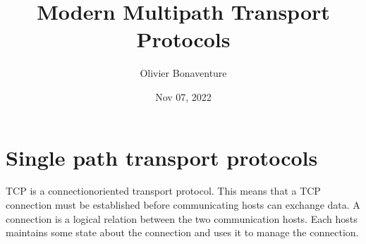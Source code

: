 \documentclass[letterpaper,10pt,english]{sphinxmanual}
\title{Modern Multipath Transport Protocols}
\date{Nov 07, 2022}
\author{Olivier Bonaventure}
\begin{document}
\pagestyle{empty}
\sphinxmaketitle
\pagestyle{plain}
\sphinxtableofcontents
\pagestyle{normal}
\label{\detokenize{index::doc}}



\chapter{Single path transport protocols}
\label{\detokenize{tcp:single-path-transport-protocols}}\label{\detokenize{tcp:chapter-tcp}}\label{\detokenize{tcp::doc}}
\sphinxAtStartPar
TCP is a connection\sphinxhyphen{}oriented transport protocol. This means that a TCP connection must be established before communicating hosts can exchange data. A connection is a logical relation between the two communication hosts. Each hosts maintains some state about the connection and uses it to manage the connection.
\end{document}
